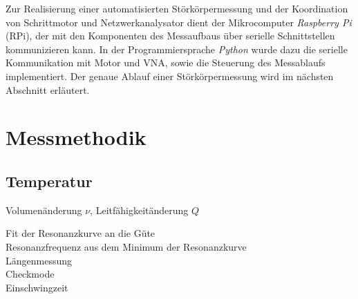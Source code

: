 Zur Realisierung einer automatisierten Störkörpermessung und der Koordination von Schrittmotor und Netzwerkanalysator dient der Mikrocomputer \textit{Raspberry Pi} (RPi), der mit den Komponenten des Messaufbaus über serielle Schnittstellen kommunizieren kann.
In der Programmiersprache \textit{Python} wurde dazu die serielle Kommunikation mit Motor und VNA, sowie die Steuerung des Messablaufs implementiert.
Der genaue Ablauf einer Störkörpermessung wird im nächsten Abschnitt erläutert.



\section{Messmethodik}

\subsection{Temperatur}
Volumenänderung $\nu$, Leitfähigkeitänderung $Q$

Fit der Resonanzkurve an die Güte\\
Resonanzfrequenz aus dem Minimum der Resonanzkurve\\
Längenmessung\\
Checkmode\\
Einschwingzeit
